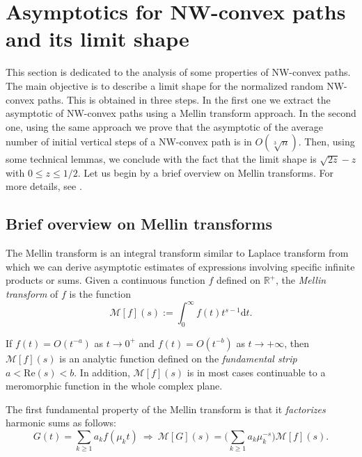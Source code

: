 \documentclass{article}
\def\cM{\mathcal{M}}
\begin{document}
\section{Asymptotics for NW-convex paths and its limit shape}
\label{limitshape}

This section is dedicated to the analysis of some properties of NW-convex paths. 
The main objective is to describe a limit shape for the normalized random NW-convex paths. This is obtained in three steps. 
In the first one we extract the asymptotic of NW-convex paths using a Mellin transform approach. 
In the second one, using the same approach we prove that the asymptotic of the average number of initial vertical steps of a NW-convex path is
 in $O(\sqrt[3]{n})$. Then, using some technical lemmas, we conclude with the fact that the limit shape
 is $\sqrt{2z}-z$ with $0\leq z \leq 1/2.$ Let us begin by a brief overview on Mellin transforms. For more details, see \cite{Flajolet2009}.

\subsection{Brief overview on Mellin  transforms}
\label{MellinOverview}
The Mellin transform is an integral transform similar to Laplace
transform from which we can derive asymptotic estimates of
expressions involving specific infinite products or sums.  Given a
continuous function $f$ defined on $\mathbb{R}^+$, the
\emph{Mellin transform} of $f$ is the function
\begin{equation}\label{eq:def_mellin}
\cM[f](s):=\int_0^{\infty}f(t)t^{s-1}\mathrm{d}t.
\end{equation}

If $f(t)=O(t^{-a})$ as $t\to 0^+$ and $f(t)=O(t^{-b})$ as
$t\to+\infty$, then $\cM[f](s)$ is an analytic function defined on the
\emph{fundamental strip} $a<\mathrm{Re}(s)<b$. In addition, $\cM[f](s)$
is in most cases continuable to a meromorphic function in the whole
complex plane.

The first fundamental property of the Mellin transform is that
it \emph{factorizes} harmonic sums as follows:
\begin{equation}
\label{eq:fac}
G(t)=\sum_{k\geq 1}a_kf(\mu_kt)\ \Rightarrow\ \cM[G](s)=\Big(\sum_{k\geq 1}a_k\mu_k^{-s}\Big) \cM[f](s).
\end{equation}
\end{document}
